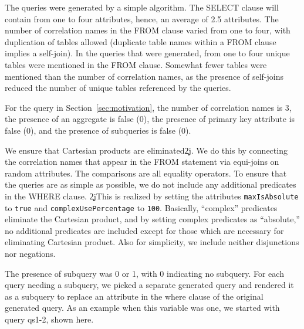 \documentclass[prodmode,acmtods]{acmsmall}
\begin{document}
The queries were generated
by a simple algorithm. 
The SELECT clause will contain from one to four
attributes, hence, an average of 2.5 attributes. The number of
correlation names
in the FROM clause varied from one to four, with duplication of tables
allowed (duplicate table names within a FROM clause implies a self-join).
In the queries that were generated, from one to four unique tables were
mentioned in the FROM clause. Somewhat fewer tables were mentioned than the
number of correlation names, as the presence of self-joins reduced the
number of unique tables referenced by the queries.

For the query in Section~\ref{sec:motivation}, the number of correlation
names is 3, the presence of an aggregate
is false (0), the presence of primary key attribute is false (0),
and the presence of subqueries is false (0).

{}We ensure that Cartesian products are
eliminated\c2j{.}{}  We do this by
connecting the correlation names that appear in the FROM statement via
equi-joins on random attributes. The comparisons are all
equality operators. To ensure that the queries are as simple as possible, we
do not include any additional predicates in the WHERE clause.  \c2j{}{This
  is realized by setting the attributes {\tt maxIsAbsolute} to {\tt true}
  and {\tt complexUsePercentage} to {\tt 100}.  Basically, ``complex''
  predicates eliminate the Cartesian product, and by setting complex
  predicates as ``absolute,'' no additional predicates are included except
  for those which are necessary for eliminating Cartesian product.} Also
for simplicity, we include neither disjunctions nor negations.


The presence of subquery was 0 or 1, with 0 indicating no
subquery. For each query needing a subquery, we picked a separate generated query and
rendered it as a subquery to replace an attribute in the where clause of the
original generated query. As an example when this variable was one, we
started with query qs1-2, shown here.
\end{document}
